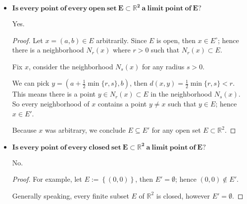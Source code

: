 \begin{Exercise}
\begin{itemize}
\item $\mathbf{Is\ every\ point\ of\ every\ open\ set\ E \subset \mathbb{R}^2\ a\ limit\ point\ of\ E?}$
\begin{answer}
Yes.
\end{answer}
\begin{proof}
Let $x = (a, b)\in E$ arbitrarily. Since $E$ is open, then $x\in E^{\circ}$; hence there is a neighborhood $N_r(x)$ where $r>0$ such that $N_r(x)\subset E$.

Fix $x$, consider the neighborhood $N_s(x)$ for any radius $s>0$. 

We can pick $y = \left( a+\frac{1}{2}\min\{r,s\}, b \right)$, then $d(x,y) = \frac{1}{2}\min\{r,s\} < r$. This means there is a point $y\in N_r(x) \subset E$ in the neighborhood $N_s(x)$. So every neighborhood of $x$ contains a point $y\neq x$ such that $y\in E$; hence $x\in E'$.

Because $x$ was arbitrary, we conclude $E \subseteq E'$ for any open set $E\subset \mathbb{R}^2$.
\end{proof}

\item $\mathbf{Is\ every\ point\ of\ every\ closed\ set\ E \subset \mathbb{R}^2\ a\ limit\ point\ of\ E?}$
\begin{answer}
No.
\end{answer}
\begin{proof}
For example, let $E := \left\{ (0,0) \right\}$, then $E' = \emptyset$; hence $(0,0)\notin E'$.

Generally speaking, every finite subset $E$ of $\mathbb{R}^2$ is closed, however $E' = \emptyset$. 
\end{proof}
\end{itemize}
\end{Exercise}